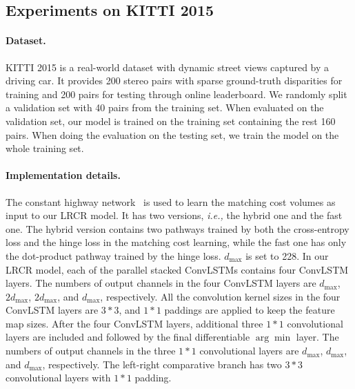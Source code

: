 \documentclass[10pt,twocolumn,letterpaper]{article}
\begin{document}
 \subsection{Experiments on KITTI 2015}
 \label{sec:experimentKITTI}
 \paragraph{Dataset.} KITTI 2015 is a real-world dataset with dynamic street views captured by a driving car. It provides 200 stereo pairs with sparse ground-truth disparities for training and 200 pairs for testing through online leaderboard. We randomly split a validation set with 40 pairs from the training set. When evaluated on the validation set, our model is trained on the training set containing the rest 160 pairs. When doing the evaluation on the testing set, we train the model on the whole training set.

 \paragraph{Implementation details.} The constant highway network~\cite{shaked2016improved} is used to learn the matching cost volumes as input to our LRCR model. It has two versions, \emph{i.e.,} the hybrid one and the fast one. The hybrid version contains two pathways trained by both the cross-entropy loss and the hinge loss in the matching cost learning, while the fast one has only the dot-product pathway trained by the hinge loss. $d_{\mathrm{max}}$ is set to 228. In our LRCR model, each  of the parallel stacked ConvLSTMs contains four ConvLSTM layers. The numbers of  output channels in the four ConvLSTM layers are $d_{\mathrm{max}}$, $2d_{\mathrm{max}}$, $2d_{\mathrm{max}}$, and $d_{\mathrm{max}}$, respectively. All the convolution kernel sizes in the four ConvLSTM layers are $3*3$, and $1*1$ paddings are applied to keep the feature map sizes. After the four ConvLSTM layers, additional three $1*1$ convolutional layers are included and followed by the final differentiable $\arg\min$ layer. The numbers of output channels in the three $1*1$ convolutional layers are $d_{\mathrm{max}}$, $d_{\mathrm{max}}$, and $d_{\mathrm{max}}$, respectively. The left-right comparative branch has two $3*3$ convolutional layers with $1*1$ padding. 
\end{document}
